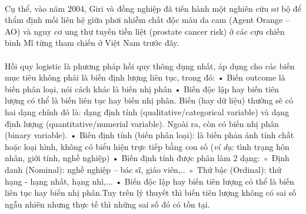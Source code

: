 \documentclass{report}
\newcommand\tab[1][1.25cm]{\hspace*{#1}}
\begin{document}
        \fontsize{13}{10}\selectfont\paragraph{}
            Cụ thể, vào năm 2004, Giri và đồng nghiệp đã tiến hành một nghiên cứu sơ bộ để thẩm định mối liên hệ giữa phơi nhiễm chất độc màu da cam (Agent Orange – AO) và nguy cơ ung thư tuyến tiền liệt (prostate cancer risk) ở các cựu chiến binh Mĩ từng tham chiến ở Việt Nam trước đây.
        
        \fontsize{13}{10}\selectfont\paragraph{}
            Hồi quy logistic là phương pháp hồi quy thông dụng nhất, áp dụng cho các biến mục tiêu không phải là biến định lượng liên tục, trong đó:
            \vspace{0.2cm}\newline\tab[1.5cm]• Biến outcome là biến phân loại, nói cách khác là biến nhị phân
            \vspace{0.2cm}\newline\tab[1.5cm]• Biến độc lập hay biến tiên lượng có thể là biến liên tục hay biến nhị phân.
            \vspace{0.2cm}\newline\tab[0.25cm]Biến (hay dữ liệu) thường sẽ có hai dạng chính đó là: dạng định tính (qualitative/categorical variable) và dạng định lượng (quantitative/numerial variable). Ngoài ra, còn có biến nhị phân (binary variable).
            \vspace{0.2cm}\newline\tab[1.5cm]• Biến định tính (biến phân loại): là biến phản ánh tính chất hoặc loại hình, không có biểu hiện trực tiếp bằng con số (\textit{ví dụ}: tình trạng hôn nhân, giới tính, nghề nghiệp)
            \vspace{0.2cm}\newline\tab[1.5cm]• Biến định tính được phân làm 2 dạng: 
            \vspace{0.2cm}\newline\tab[2.5cm]◦ Định danh (Nominal): nghề nghiệp – bác sĩ, giáo viên,..
            \vspace{0.2cm}\newline\tab[2.5cm]◦ Thứ bậc (Ordinal): thứ hạng - hạng nhất, hạng nhì,...
            \vspace{0.2cm}\newline\tab[1.5cm]• Biến độc lập hay biến tiên lượng có thể là biến liên tục hay biến nhị phân.Tuy trên lý thuyết thì biến tiên lượng không có sai số ngẫu nhiên nhưng thực tế thì những sai số đó có tồn tại. 
\end{document}
